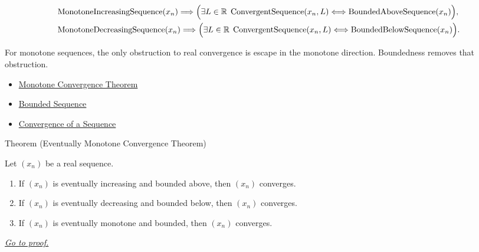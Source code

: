 \begin{remark*}
\[
\begin{aligned}
&\operatorname{MonotoneIncreasingSequence}(x_n)
\Longrightarrow
\Bigl(
\exists L\in\mathbb{R}\;\operatorname{ConvergentSequence}(x_n,L)
\Longleftrightarrow
\operatorname{BoundedAboveSequence}(x_n)
\Bigr),\\
&\operatorname{MonotoneDecreasingSequence}(x_n)
\Longrightarrow
\Bigl(
\exists L\in\mathbb{R}\;\operatorname{ConvergentSequence}(x_n,L)
\Longleftrightarrow
\operatorname{BoundedBelowSequence}(x_n)
\Bigr).
\end{aligned}
\]
\end{remark*}

\begin{remark*}[Interpretation]
For monotone sequences, the only obstruction to real convergence is escape in
the monotone direction. Boundedness removes that obstruction.
\end{remark*}

\begin{dependencies}
\begin{itemize}
  \item \hyperref[thm:monotone-convergence-theorem]{Monotone Convergence Theorem}
  \item \hyperref[def:bounded-sequence]{Bounded Sequence}
  \item \hyperref[def:convergent-sequence]{Convergence of a Sequence}
\end{itemize}
\end{dependencies}


\begin{theorembox}{Theorem (Eventually Monotone Convergence Theorem)}
\begin{theorem}
\label{thm:eventually-monotone-convergence-theorem}
Let $(x_n)$ be a real sequence.
\begin{enumerate}[label=(\alph*)]
  \item If $(x_n)$ is eventually increasing and bounded above, then
  $(x_n)$ converges.
  \item If $(x_n)$ is eventually decreasing and bounded below, then
  $(x_n)$ converges.
  \item If $(x_n)$ is eventually monotone and bounded, then $(x_n)$ converges.
\end{enumerate}

\smallskip
\noindent
\hyperref[prf:eventually-monotone-convergence-theorem]{\textit{Go to proof.}}
\end{theorem}
\end{theorembox}

